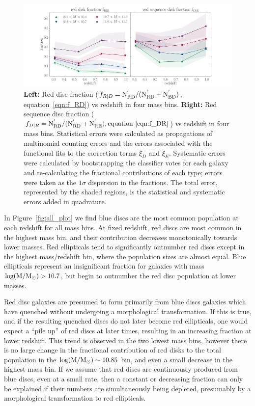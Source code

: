 \documentclass[useAMS,usenatbib]{mn2e}
\begin{document}
\begin{figure}
\centering
\includegraphics[width=\textwidth,trim={0cm 0cm 2cm 1cm},clip]{figures/red_disk_fractions.pdf}
\caption{\textbf{Left:} Red disc fraction ($f_{R|D} = \rm N^{'}_{RD}/(N^{'}_{RD}+N^{'}_{BD})$, equation~\ref{eqn:f_RD}) vs redshift in four mass bins. \textbf{Right:} Red sequence disc fraction ($f_{D|R} = \rm N^{'}_{RD}/(N^{'}_{RD}+N^{'}_{RE}), equation~\ref{eqn:f_DR}$) vs redshift in four mass bins. Statistical errors were calculated as propagations of multinomial counting errors and the errors associated with the functional fits to the correction terms $\xi_D$ and $\xi_E$. Systematic errors were calculated by bootstrapping the classifier votes for each galaxy and re-calculating the fractional contributions of each type; errors were taken as the $1\sigma$ dispersion in the fractions. The total error, represented by the shaded regions, is the statistical and systematic errors added in quadrature.} 
\label{fig:f_results}
\end{figure}


In Figure~\ref{fig:all_plot} we find blue discs are the most common population at each redshift for all mass bins. At fixed redshift, red discs are most common in the highest mass bin, and their contribution decreases monotonically towards lower masses. Red ellipticals tend to significantly outnumber red discs except in the highest mass/redshift bin, where the population sizes are almost equal. Blue ellipticals represent an insignificant fraction for galaxies with mass $\rm log(M/M_{\odot})>10.7$, but begin to outnumber the red disc population at lower masses. 


Red disc galaxies are presumed to form primarily from blue discs galaxies which have quenched without undergoing a morphological transformation. If this is true, and if the resulting quenched discs do not later become red ellipticals, one would expect a ``pile up'' of red discs at later times, resulting in an increasing fraction at lower redshift. This trend is observed in the two lowest mass bins, however there is no large change in the fractional contribution of red disks to the total population in the $\rm log(M/M_{\odot})\sim10.85$ bin, and even a small decrease in the highest mass bin. If we assume that red discs are continuously produced from blue discs, even at a small rate, then a constant or decreasing fraction can only be explained if their numbers are simultaneously being depleted, presumably by a morphological transformation to red ellipticals.
\end{document}
